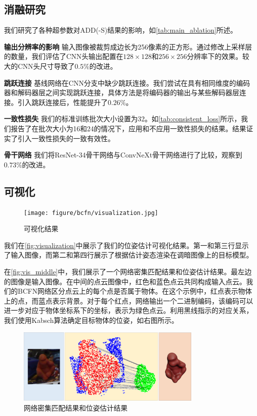 
\subsection{消融研究}

我们研究了各种超参数对ADD(-S)结果的影响，如\autoref{tab:main_ablation}所述。

\textbf{输出分辨率的影响 }输入图像被裁剪成边长为256像素的正方形。通过修改上采样层的数量，我们评估了CNN头输出配置在$128 \times 128$和$256 \times 256$分辨率下的效果。较大的CNN头尺寸导致了$0.5\%$的改进。

\textbf{跳跃连接 } 基线网络在CNN分支中缺少跳跃连接。我们尝试在具有相同维度的编码器和解码器层之间实现跳跃连接，具体方法是将编码器的输出与某些解码器层连接。引入跳跃连接后，性能提升了$0.26\%$。



\textbf{一致性损失 } 我们的标准训练批次大小设置为32。如\autoref{tab:consistent_loss}所示，我们报告了在批次大小为16和24的情况下，应用和不应用一致性损失的结果。结果证实了引入一致性损失的一致有效性。

\textbf{骨干网络 } 我们将ResNet-34骨干网络与ConvNeXt骨干网络进行了比较，观察到$0.73\%$的改进。

\subsection{可视化}

\begin{figure}[htbp]
\centerline{\texttt{[image: figure/bcfn/visualization.jpg]}}
    \caption{可视化结果}
    \label{fig:visualization}
\end{figure}

我们在\autoref{fig:visualization}中展示了我们的位姿估计可视化结果。第一和第三行显示了输入图像，而第二和第四行展示了根据估计姿态渲染在调暗图像上的目标模型。

在\autoref{fig:vis_middle}中，我们展示了一个网络密集匹配结果和位姿估计结果。最左边的图像是输入图像。在中间的点云图像中，红色和蓝色点云共同构成输入点云。我们的BCFN网络区分点云上的每个点是否属于物体。在这个示例中，红点表示物体上的点，而蓝点表示背景。对于每个红点，网络输出一个二进制编码，该编码可以进一步对应于物体坐标系下的坐标，表示为绿色点云。利用黑线指示的对应关系，我们使用Kabsch算法确定目标物体的位姿，如右图所示。

\begin{figure}[htbp]
\centerline{\includegraphics[width=0.80\textwidth]{figure/bcfn/vis_middle.jpg}}
    \caption{网络密集匹配结果和位姿估计结果}
    \label{fig:vis_middle}
\end{figure}
